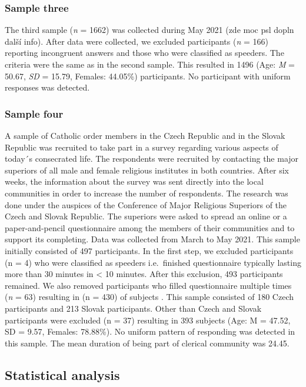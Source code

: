 \documentclass[ijerph,article,accept,moreauthors,pdftex]{mdpi}
\begin{document}
\hypertarget{sample-three}{%
\subsubsection{Sample three}\label{sample-three}}

The third sample (\emph{n} = 1662) was collected during May 2021 (zde
moc psl dopln další info). After data were collected, we excluded
participants (\emph{n} = 166) reporting incongruent answers and those
who were classified as speeders. The criteria were the same as in the
second sample. This resulted in 1496 (Age: \emph{M} = 50.67, \emph{SD} =
15.79, Females: 44.05\%) participants. No participant with uniform
responses was detected.

\hypertarget{sample-four}{%
\subsubsection{Sample four}\label{sample-four}}

A sample of Catholic order members in the Czech Republic and in the
Slovak Republic was recruited to take part in a survey regarding various
aspects of today´s consecrated life. The respondents were recruited by
contacting the major superiors of all male and female religious
institutes in both countries. After six weeks, the information about the
survey was sent directly into the local communities in order to increase
the number of respondents. The research was done under the auspices of
the Conference of Major Religious Superiors of the Czech and Slovak
Republic. The superiors were asked to spread an online or a
paper-and-pencil questionnaire among the members of their communities
and to support its completing. Data was collected from March to May
2021. This sample initially consisted of 497 participants. In the first
step, we excluded participants (n = 4) who were classified as speeders
i.e.~finished questionnaire typically lasting more than 30 minutes in
\textless{} 10 minutes. After this exclusion, 493 participants remained.
We also removed participants who filled questionnaire multiple times
(\emph{n} = 63) resulting in (n = 430) of subjects . This sample
consisted of 180 Czech participants and 213 Slovak participants. Other
than Czech and Slovak participants were excluded (n = 37) resulting in
393 subjects (Age: M = 47.52, SD = 9.57, Females: 78.88\%). No uniform
pattern of responding was detected in this sample. The mean duration of
being part of clerical community was 24.45.

\hypertarget{statistical-analysis}{%
\subsection{Statistical analysis}\label{statistical-analysis}}
\end{document}
